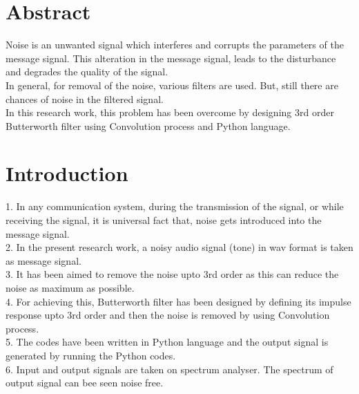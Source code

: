 \documentclass[journal,10pt,twocolumn]{article}
\begin{document}
\section{Abstract}
\begin{flushleft}
Noise is an unwanted signal which interferes and corrupts the parameters of the message signal. This alteration in the message signal, leads to the disturbance and degrades the quality of the signal. \\
\vspace{0.2cm}
In general, for removal of the noise, various filters are used. But, still there are chances of noise in the filtered signal.\\
\vspace{0.2cm}
In this research work, this problem has been overcome by designing 3rd order Butterworth filter using Convolution process and Python language.\\
\end{flushleft}
\section{Introduction}

\begin{flushleft}
1. In any communication system, during the transmission of the signal, or while receiving the signal, it is universal fact that, noise gets introduced into the message signal.\\

2. In the present research work, a noisy audio signal (tone) in wav format is taken as message signal.\\
\vspace{0.2cm}
3. It has been aimed to remove the noise upto 3rd order as this can reduce the noise as maximum as possible. \\
\vspace{0.2cm}
4. For achieving this, Butterworth filter has been designed by defining its impulse response upto 3rd order and then the noise is removed by using Convolution process. \\
\vspace{0.2cm}
5. The codes have been written in Python language and the output signal is generated by running the Python codes. \\
\vspace{0.2cm}
6. Input and output signals are taken on spectrum analyser. The spectrum of output signal can bee seen noise free. 
\end{flushleft}
\end{document}
